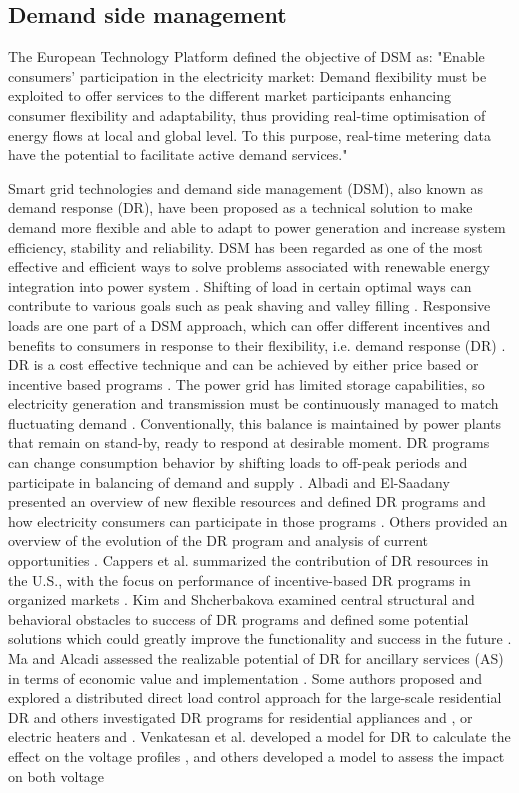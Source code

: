 \documentclass[a4paper,11pt,twoside,openright]{report}
\begin{document}
\subsection{Demand side management}
The European Technology Platform defined the objective of DSM as: "Enable consumers' participation in the electricity market: Demand flexibility must be exploited to offer services to the different market participants enhancing consumer flexibility and adaptability, thus providing real-time optimisation of energy flows at local and global level. To this purpose, real-time metering data have the potential to facilitate active demand services." \cite{ETP_SG}

Smart grid technologies and demand side management (DSM), also known as demand response (DR), have been proposed as a technical solution to make demand more flexible and able to adapt to power generation and increase system efficiency, stability and reliability. DSM has been regarded as one of the most effective and efficient ways to solve problems associated with renewable energy integration into power system \cite{Sikai2009}. Shifting of load in certain optimal ways can contribute to various goals such as peak shaving and valley filling \cite{Kempton2005}. Responsive loads are one part of a DSM approach, which can offer different incentives and benefits to consumers in response to their flexibility, i.e. demand response (DR) \cite{Muratori}. DR is a cost effective technique and can be achieved by either price based or incentive based programs \cite{Wu}. The power grid has limited storage capabilities, so electricity generation and transmission must be continuously managed to match fluctuating demand \cite{Albadi}. Conventionally, this balance is maintained by power plants that remain on stand-by, ready to respond at desirable moment. DR programs can change consumption behavior by shifting loads to off-peak periods and participate in balancing of demand and supply \cite{Gottwalt}. Albadi and El-Saadany presented an overview of new flexible resources and defined DR programs and how electricity consumers can participate in those programs \cite{Albadi}. Others provided an overview of the evolution of the DR program and analysis of current opportunities \cite{Walawalkar}. Cappers et al. summarized the contribution of DR resources in the U.S., with the focus on performance of incentive-based DR programs in organized markets \cite{Cappers}. Kim and Shcherbakova examined central structural and behavioral obstacles to success of DR programs and defined some potential solutions which could greatly improve the functionality and success in the future \cite{Kim}. Ma and Alcadi assessed the realizable potential of DR for ancillary services (AS) in terms of economic value and implementation \cite{Ma}. Some authors proposed and explored a distributed direct load control approach for the large-scale residential DR \cite{Chen} and others investigated DR programs for residential appliances \cite{Vivekananthan} and \cite{Hamidi}, or electric heaters \cite{Ericson} and \cite{Saele}. Venkatesan et al. developed a model for DR to calculate the effect on the voltage profiles \cite{Venkatesan2011}, and others developed a model to assess the impact on both voltage 
\end{document}
